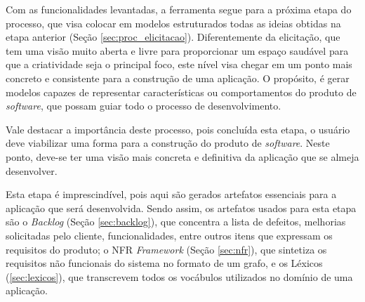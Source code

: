 \label{sec:modelagem_proposta}

Com as funcionalidades levantadas, a ferramenta segue para a próxima etapa do processo, que visa colocar em modelos estruturados todas as ideias obtidas na etapa anterior (Seção \ref{sec:proc_elicitacao}). Diferentemente da elicitação, que tem uma visão muito aberta e livre para proporcionar um espaço saudável para que a criatividade seja o principal foco, este nível visa chegar em um ponto mais concreto e consistente para a construção de uma aplicação. O propósito, é gerar modelos capazes de representar características ou comportamentos do produto de \textit{software}, que possam guiar todo o processo de desenvolvimento.

Vale destacar a importância deste processo, pois concluída esta etapa, o usuário deve viabilizar uma forma para a construção do produto de \textit{software}. Neste ponto, deve-se ter uma visão mais concreta e definitiva da aplicação que se almeja desenvolver.

Esta etapa é imprescindível, pois aqui são gerados artefatos essenciais para a aplicação que será desenvolvida. Sendo assim, os artefatos usados para esta etapa são o \textit{Backlog} (Seção \ref{sec:backlog}), que concentra a lista de defeitos, melhorias solicitadas pelo cliente, funcionalidades, entre outros itens que expressam os requisitos do produto; o NFR \textit{Framework} (Seção \ref{sec:nfr}), que sintetiza os requisitos não funcionais do sistema no formato de um grafo, e os Léxicos (\ref{sec:lexicos}), que transcrevem todos os vocábulos utilizados no domínio de uma aplicação.



